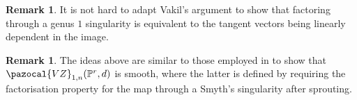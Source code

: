 \documentclass[11pt]{amsart}
\newcommand{\PP}{\mathbb P}
\renewcommand{\to}{\rightarrow}
\theoremstyle{plain}
\newtheorem{prop}[thm]{Proposition}
\theoremstyle{definition}
\newtheorem{remark}[thm]{Remark}
\begin{document}
\begin{remark}
It is not hard to adapt Vakil's argument \cite{Vre} to show that factoring through a genus $1$ singularity is equivalent to the tangent vectors being linearly dependent in the image.
\end{remark}
\begin{remark}
The ideas above are similar to those employed in \cite[Theorem 4.5.1]{RSPW} to show that $\pazocal{VZ}_{1,n}(\PP^r,d)$ is smooth, where the latter is defined by requiring the factorisation property for the map through a Smyth's singularity after sprouting.
\end{remark}

\end{document}
